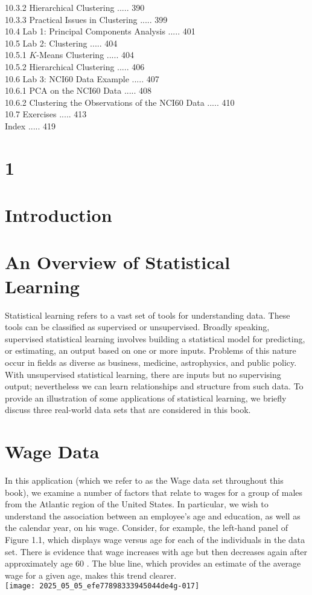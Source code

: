 \documentclass[10pt]{article}
\begin{document}
10.3.2 Hierarchical Clustering ..... 390\\
10.3.3 Practical Issues in Clustering ..... 399\\
10.4 Lab 1: Principal Components Analysis ..... 401\\
10.5 Lab 2: Clustering ..... 404\\
10.5.1 $K$-Means Clustering ..... 404\\
10.5.2 Hierarchical Clustering ..... 406\\
10.6 Lab 3: NCI60 Data Example ..... 407\\
10.6.1 PCA on the NCI60 Data ..... 408\\
10.6.2 Clustering the Observations of the NCI60 Data ..... 410\\
10.7 Exercises ..... 413\\
Index ..... 419

\section*{1}
\section*{Introduction}
\section*{An Overview of Statistical Learning}
Statistical learning refers to a vast set of tools for understanding data. These tools can be classified as supervised or unsupervised. Broadly speaking, supervised statistical learning involves building a statistical model for predicting, or estimating, an output based on one or more inputs. Problems of this nature occur in fields as diverse as business, medicine, astrophysics, and public policy. With unsupervised statistical learning, there are inputs but no supervising output; nevertheless we can learn relationships and structure from such data. To provide an illustration of some applications of statistical learning, we briefly discuss three real-world data sets that are considered in this book.

\section*{Wage Data}
In this application (which we refer to as the Wage data set throughout this book), we examine a number of factors that relate to wages for a group of males from the Atlantic region of the United States. In particular, we wish to understand the association between an employee's age and education, as well as the calendar year, on his wage. Consider, for example, the left-hand panel of Figure 1.1, which displays wage versus age for each of the individuals in the data set. There is evidence that wage increases with age but then decreases again after approximately age 60 . The blue line, which provides an estimate of the average wage for a given age, makes this trend clearer.\\
\texttt{[image: 2025\_05\_05\_efe77898333945044de4g-017]}
\end{document}
